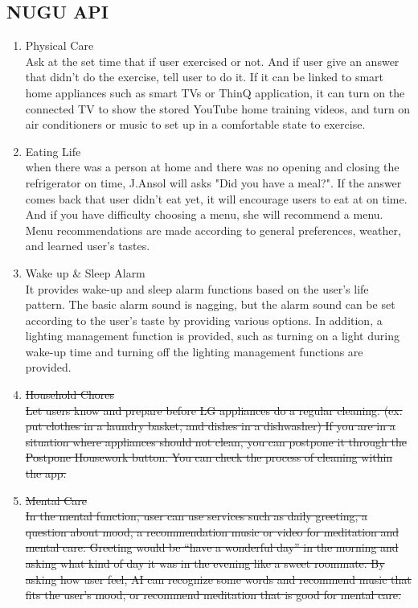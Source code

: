 \documentclass[conference]{IEEEtran}
\begin{document}
\subsection{NUGU API}
    \begin{enumerate}
        \item Physical Care\\
        Ask at the set time that if user exercised or not. And if user give an answer that didn't do the exercise, tell user to do it. If it can be linked to smart home appliances such as smart TVs or ThinQ application, it can turn on the connected TV to show the stored YouTube home training videos, and turn on air conditioners or music to set up in a comfortable state to exercise.\\        
        \item Eating Life\\
            when there was a person at home and there was no opening and closing the refrigerator on time, J.Ansol will asks "Did you have a meal?". If the answer comes back that user didn't eat yet, it will encourage users to eat at on time. And if you have difficulty choosing a menu, she will recommend a menu. Menu recommendations are made according to general preferences, weather, and learned user's tastes. \\
            
        \item Wake up \& Sleep Alarm\\
        It provides wake-up and sleep alarm functions based on the user's life pattern. The basic alarm sound is nagging, but the alarm sound can be set according to the user's taste by providing various options. In addition, a lighting management function is provided, such as turning on a light during wake-up time and turning off the lighting management functions are provided.\\
        
        \item \sout{Household Chores\\
        Let users know and prepare before LG appliances do a regular cleaning. (ex. put clothes in a laundry basket, and dishes in a dishwasher) If you are in a situation where appliances should not clean, you can postpone it through the Postpone Housework button. You can check the process of cleaning within the app.\\}
        
        \item \sout{Mental Care\\
        In the mental function, user can use services such as daily greeting, a question about mood, a recommendation music or video for meditation and mental care. Greeting would be “have a wonderful day” in the morning and asking what kind of day it was in the evening like a sweet roommate. By asking how user feel, AI can recognize some words and recommend music that fits the user's mood, or recommend meditation that is good for mental care.\\}
    \end{enumerate}
    
\end{document}
